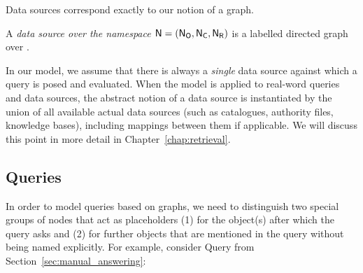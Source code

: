 Data sources correspond exactly to our notion of a graph.
%
\begin{definition}
  \label{def:data_source}
  A \emph{data source over the namespace $\textup{\textsf{N}}=(\mathsf{N}_\mathsf{O},\mathsf{N}_\mathsf{C},\mathsf{N}_\mathsf{R})$} is a labelled directed graph
  over \namespace.
\end{definition}
%
In our model, we assume that there is always a \emph{single} data source against which a query is posed and evaluated.
When the model is applied to real-word queries and data sources,
the abstract notion of a data source is instantiated by the union of
all available actual data sources (such as catalogues, authority files, knowledge bases),
including mappings between them if applicable.
We will discuss this point in more detail in Chapter~\ref{chap:retrieval}.

\subsection{Queries}

In order to model queries based on graphs, we need to distinguish
two special groups of nodes that act as placeholders (1) for the object(s) after which the query asks
and (2) for further objects that are mentioned in the query without being named explicitly.
For example, consider Query  from Section~\ref{sec:manual_answering}:
%
\Qtwoprime

